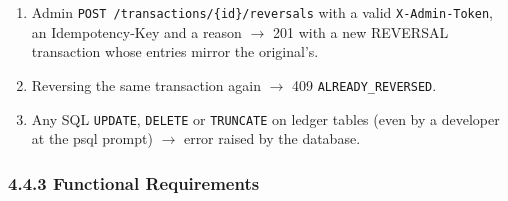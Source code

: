 \documentclass[11pt,a4paper]{article}
\providecommand{\tightlist}{\setlength{\itemsep}{2pt}\setlength{\parskip}{0pt}}
\begin{document}
\begin{enumerate}
\def\labelenumi{\arabic{enumi}.}
\tightlist
\item
  Admin \texttt{POST\ /\allowbreak{}transactions/\allowbreak{}\{id\}/\allowbreak{}reversals} with a valid \texttt{X-Admin-Token}, an Idempotency-Key and
  a reason \ensuremath{\rightarrow} 201 with a new REVERSAL transaction whose entries mirror the original's.
\item
  Reversing the same transaction again \ensuremath{\rightarrow} 409 \texttt{ALREADY\_\allowbreak{}REVERSED}.
\item
  Any SQL \texttt{UPDATE}, \texttt{DELETE} or \texttt{TRUNCATE} on ledger tables (even by a developer at the psql
  prompt) \ensuremath{\rightarrow} error raised by the database.
\end{enumerate}

\subsubsection{4.4.3 Functional Requirements}\label{functional-requirements-3}
\end{document}
